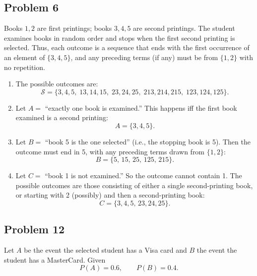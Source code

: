 \documentclass{article}
\begin{document}
\subsection*{Problem 6}

Books $1,2$ are first printings; books $3,4,5$ are second printings. The student examines books in random
order and stops when the first second printing is selected. Thus, each outcome is a sequence that ends with
the first occurrence of an element of $\{3,4,5\}$, and any preceding terms (if any) must be from $\{1,2\}$
with no repetition.

\begin{enumerate}
\item[(a)] The possible outcomes are:
\[
\mathcal{S}=
\{3,4,5,\;
13,14,15,\;
23,24,25,\;
213,214,215,\;
123,124,125\}.
\]

\item[(b)] Let $A=$ ``exactly one book is examined.'' This happens iff the first book examined is a second
    printing:
\[
A=\{3,4,5\}.
\]

\item[(c)] Let $B=$ ``book 5 is the one selected'' (i.e., the stopping book is 5). Then the outcome must end
    in 5, with any preceding terms drawn from $\{1,2\}$:
\[
B=\{5,\,15,\,25,\,125,\,215\}.
\]

\item[(d)] Let $C=$ ``book 1 is not examined.'' So the outcome cannot contain 1. The possible outcomes are
    those consisting of either a single second-printing book, or starting with 2 (possibly) and then a
    second-printing book:
\[
C=\{3,4,5,\,23,24,25\}.
\]
\end{enumerate}

\subsection*{Problem 12}

Let $A$ be the event the selected student has a Visa card and $B$ the event the student has a MasterCard.
Given
\[
P(A)=0.6,\qquad P(B)=0.4.
\]
\end{document}
